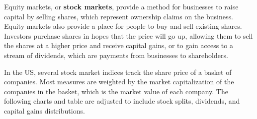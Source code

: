 \begin{minipage}{0.76\textwidth}
\small Equity markets, or \textbf{stock markets}, provide a method for businesses to raise capital by selling shares, which represent ownership claims on the business. Equity markets also provide a place for people to buy and sell existing shares. Investors purchase shares in hopes that the price will go up, allowing them to sell the shares at a higher price and receive capital gains, or to gain access to a stream of dividends, which are payments from businesses to shareholders. 

In the US, several stock market indices track the share price of a basket of companies. Most measures are weighted by the market capitalization of the companies in the basket, which is the market value of each company. The following charts and table are adjusted to include stock splits, dividends, and capital gains distributions.
\vspace{1mm}

\vspace*{-2mm}

\equitylt


\end{minipage}
